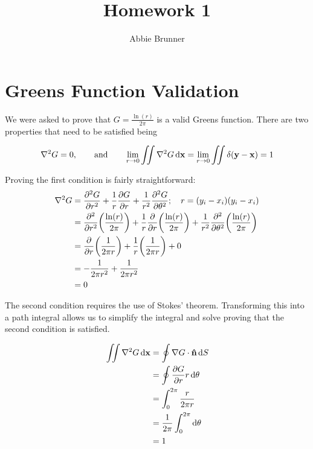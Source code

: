 \documentclass{report}
\title{Homework 1}
\author{Abbie Brunner}
\begin{document}
\maketitle

\tableofcontents

\chapter{Greens Function Validation}
We were asked to prove that $G = \frac{\ln(r)}{2\pi}$ is a valid Greens function.
There are two properties that need to be satisfied being

\begin{equation*}
   \nabla^2G = 0, \qquad \text{and} \qquad \lim_{r \to 0}\iint\nabla^2G\dd{\vb{x}} = \lim_{r \to 0}\iint \delta(\vb{y}- \vb{x}) = 1
\end{equation*}

Proving the first condition is fairly straightforward:
\begin{equation*}
   \begin{split}
      \nabla^2 G &=\pdv[2]{G}{r} + \frac{1}{r}\pdv{G}{r} + \frac{1}{r^2}\pdv[2]{G}{\theta}; \quad r=(y_i-x_i)(y_i-x_i) \\
      &= \pdv[2]{r}\qty(\frac{\ln(r)}{2\pi}) + \frac{1}{r}\pdv{r}\qty(\frac{\ln(r)}{2\pi}) + \frac{1}{r^2}\pdv[2]{\theta}\qty(\frac{\ln(r)}{2\pi}) \\
      &= \pdv{r}\qty(\frac{1}{2\pi r}) + \frac{1}{r}\qty(\frac{1}{2\pi r}) + 0 \\
      &= -\frac{1}{2\pi r^2} + \frac{1}{2\pi r^2} \\
      &= 0
   \end{split}
\end{equation*}

The second condition requires the use of Stokes' theorem.
Transforming this into a path integral allows us to simplify the integral and solve proving that the second condition is satisfied.

\begin{equation*}
   \begin{split}
      \iint \nabla^2 G \dd{\vb{x}} &= \oint \nabla G \cdot \vb{\hat{n}} \dd{S}\\
      &= \oint \pdv{G}{r}r \dd{\theta}\\
      &= \int_0^{2\pi} \frac{r}{2\pi r} \\
      &= \frac{1}{2\pi}\int_0^{2\pi}\dd{\theta} \\
      &= 1
   \end{split}
\end{equation*}
\end{document}
